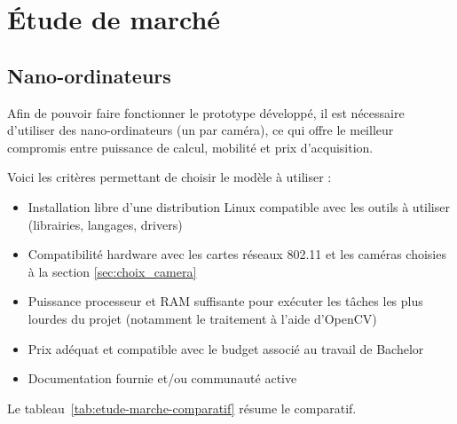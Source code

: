 \chapter{Étude de marché}
\label{ch:etude-de-marche}

\section{Nano-ordinateurs}

Afin de pouvoir faire fonctionner le prototype développé, il est nécessaire d’utiliser des nano-ordinateurs (un par
caméra), ce qui offre le meilleur compromis entre puissance de calcul, mobilité et prix d’acquisition.

Voici les critères permettant de choisir le modèle à utiliser :
\begin{itemize}
\item Installation libre d’une distribution Linux compatible avec les outils à utiliser (librairies, langages, drivers)
\item Compatibilité hardware avec les cartes réseaux 802.11 et les caméras choisies à la section \ref{sec:choix_camera}
\item Puissance processeur et RAM suffisante pour exécuter les tâches les plus lourdes du projet (notamment le traitement à l'aide d'OpenCV)
\item Prix adéquat et compatible avec le budget associé au travail de Bachelor
\item Documentation fournie et/ou communauté active
\end{itemize}

Le tableau~\ref{tab:etude-marche-comparatif} résume le comparatif.

